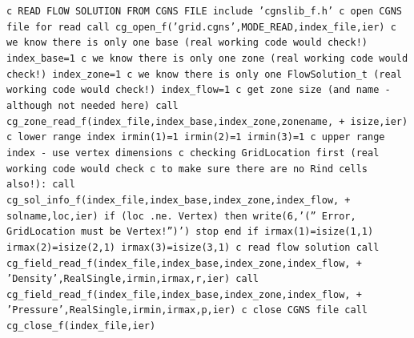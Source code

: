 \documentclass[12pt]{article}
\begin{document}
{\tt \noindent c  READ FLOW SOLUTION FROM CGNS FILE
\newline\indent      include 'cgnslib\_f.h'
\newline c  open CGNS file for read
\newline\indent      call cg\_open\_f('grid.cgns',MODE\_READ,index\_file,ier)
\newline c  we know there is only one base (real working code would check!)
\newline\indent      index\_base=1
\newline c  we know there is only one zone (real working code would check!)
\newline\indent      index\_zone=1
\newline c  we know there is only one FlowSolution\_t (real working code would check!)
\newline\indent      index\_flow=1
\newline c   get zone size (and name - although not needed here)
\newline\indent      call cg\_zone\_read\_f(index\_file,index\_base,index\_zone,zonename,
\newline + \indent isize,ier)
\newline c   lower range index
\newline\indent      irmin(1)=1
\newline\indent      irmin(2)=1
\newline\indent      irmin(3)=1
\newline c   upper range index - use vertex dimensions
\newline c   checking GridLocation first (real working code would check
\newline c   to make sure there are no Rind cells also!):
\newline\indent      call cg\_sol\_info\_f(index\_file,index\_base,index\_zone,index\_flow,
\newline + \indent solname,loc,ier)
\newline\indent      if (loc .ne. Vertex) then
\newline\indent\indent        write(6,'('' Error, GridLocation must be Vertex!'')')
\newline\indent\indent        stop
\newline\indent      end if
\newline\indent      irmax(1)=isize(1,1)
\newline\indent      irmax(2)=isize(2,1)
\newline\indent      irmax(3)=isize(3,1)
\newline c   read flow solution
\newline\indent      call cg\_field\_read\_f(index\_file,index\_base,index\_zone,index\_flow,
\newline + \indent 'Density',RealSingle,irmin,irmax,r,ier)
\newline\indent      call cg\_field\_read\_f(index\_file,index\_base,index\_zone,index\_flow,
\newline + \indent 'Pressure',RealSingle,irmin,irmax,p,ier)
\newline c  close CGNS file
\newline\indent      call cg\_close\_f(index\_file,ier)}
\end{document}

